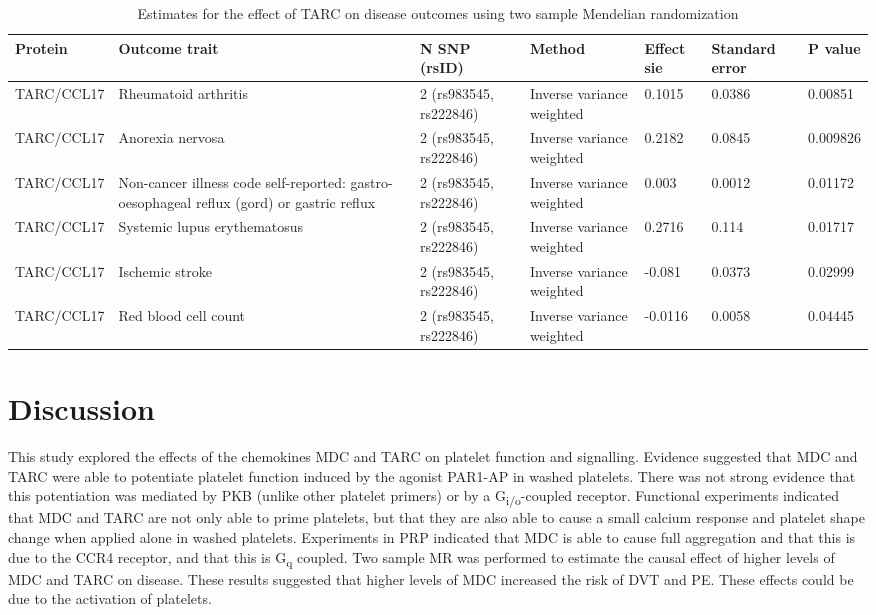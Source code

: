 \documentclass[11pt,twoside]{bristolthesis}
\begin{document}
\begin{landscape}\begin{table}

\caption{\label{tab:TARC-disease-MR}Estimates for the effect of TARC on disease outcomes using two sample Mendelian randomization}
\centering
\fontsize{10}{12}\selectfont
\begin{tabu} to 
\toprule
Protein & Outcome trait & N SNP (rsID) & Method & Effect sie & Standard error & P value\\
\midrule
TARC/CCL17 & Rheumatoid arthritis & 2 (rs983545, rs222846) & Inverse variance weighted & 0.1015 & 0.0386 & 0.00851\\
TARC/CCL17 & Anorexia nervosa & 2 (rs983545, rs222846) & Inverse variance weighted & 0.2182 & 0.0845 & 0.009826\\
TARC/CCL17 & Non-cancer illness code self-reported: gastro-oesophageal reflux (gord) or gastric reflux & 2 (rs983545, rs222846) & Inverse variance weighted & 0.003 & 0.0012 & 0.01172\\
TARC/CCL17 & Systemic lupus erythematosus & 2 (rs983545, rs222846) & Inverse variance weighted & 0.2716 & 0.114 & 0.01717\\
TARC/CCL17 & Ischemic stroke & 2 (rs983545, rs222846) & Inverse variance weighted & -0.081 & 0.0373 & 0.02999\\
\addlinespace
TARC/CCL17 & Red blood cell count & 2 (rs983545, rs222846) & Inverse variance weighted & -0.0116 & 0.0058 & 0.04445\\
\bottomrule
\end{tabu}
\end{table}
\end{landscape}
\hypertarget{discussion-2}{%
\section{Discussion}\label{discussion-2}}

This study explored the effects of the chemokines MDC and TARC on platelet function and signalling. Evidence suggested that MDC and TARC were able to potentiate platelet function induced by the agonist PAR1-AP in washed platelets. There was not strong evidence that this potentiation was mediated by PKB (unlike other platelet primers) or by a G\textsubscript{i/o}-coupled receptor. Functional experiments indicated that MDC and TARC are not only able to prime platelets, but that they are also able to cause a small calcium response and platelet shape change when applied alone in washed platelets. Experiments in PRP indicated that MDC is able to cause full aggregation and that this is due to the CCR4 receptor, and that this is G\textsubscript{q} coupled. Two sample MR was performed to estimate the causal effect of higher levels of MDC and TARC on disease. These results suggested that higher levels of MDC increased the risk of DVT and PE. These effects could be due to the activation of platelets.
\end{document}
